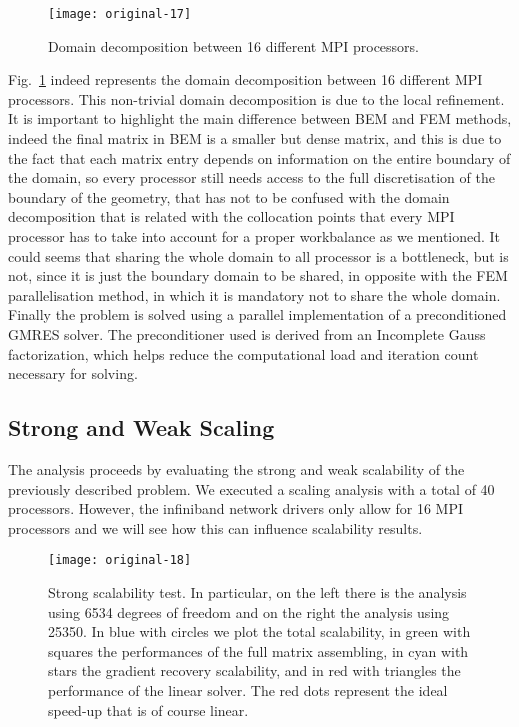 \begin{figure}
\begin{center}
    \texttt{[image: original-17]}    %
    \caption{Domain decomposition between 16 different MPI processors.} 
    \label{fig:original-17}
\end{center}
\end{figure}

Fig.~\ref{fig:original-17} indeed represents the domain decomposition between 16 different MPI processors. This non-trivial domain decomposition is due to the local refinement.  It is important to highlight the main difference between BEM and FEM methods, indeed the final matrix in BEM is a smaller but dense matrix, and this is due to the fact that each matrix entry depends on information on the entire boundary of the domain, so every processor still needs access to the full discretisation of the boundary of the geometry, that has not to be confused with the domain decomposition that is related with the
collocation points that every MPI processor has to take into account for a proper workbalance as we mentioned. It could seems that sharing the whole domain to all processor is a bottleneck, but is not, since it is just the boundary domain to be shared, in opposite with the FEM parallelisation method, in which it is mandatory not to share the whole domain. Finally the problem is solved using a parallel implementation of a preconditioned GMRES solver. The preconditioner used is derived from an Incomplete Gauss factorization, which helps reduce the computational load and iteration count necessary for solving.

\subsection{Strong and Weak Scaling}
\label{sub:strong_and_weak_scaling}

The analysis proceeds by evaluating the strong and weak scalability of the previously described problem. We executed a scaling analysis with a total of 40 processors. However, the infiniband network drivers only allow for 16 MPI processors and we will see how this can influence scalability results.

\begin{figure*}
\begin{center}
    \texttt{[image: original-18]}    %
    \caption{Strong scalability test. In particular, on the left there is the analysis using 6534 degrees of freedom and on the right the analysis using 25350. In blue with circles we plot the total scalability, in green with squares the performances of the full matrix assembling, in cyan with stars the gradient recovery scalability, and in red with triangles the performance of the linear solver. The red dots represent the ideal speed-up that is of course linear.} 
    \label{fig:original-18}
\end{center}
\end{figure*}

